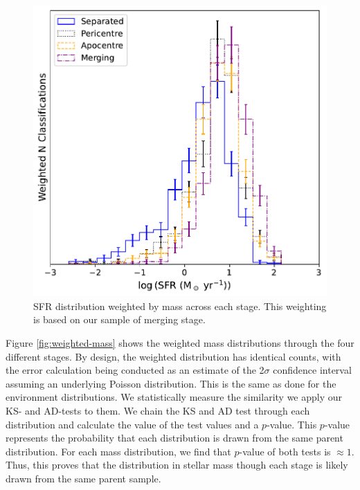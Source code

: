 \begin{figure}
\centering
\includegraphics[width=\textwidth]{Chapter3/figures/sfr_dist.pdf}
\caption[SFR distribution weighted by mass across each stage.]{SFR distribution weighted by mass across each stage. This weighting is based on our sample of merging stage.}
\label{fig:weighted-sfr}
\end{figure}

Figure \ref{fig:weighted-mass} shows the weighted mass distributions through the four different stages. By design, the weighted distribution has identical counts, with the error calculation being conducted as an estimate of the 2$\sigma$ confidence interval assuming an underlying Poisson distribution. This is the same as done for the environment distributions. We statistically measure the similarity we apply our KS- and AD-tests to them. We chain the KS and AD test through each distribution and calculate the value of the test values and a $p$-value. This $p$-value represents the probability that each distribution is drawn from the same parent distribution. For each mass distribution, we find that $p$-value of both tests is $\approx1$. Thus, this proves that the distribution in stellar mass though each stage is likely drawn from the same parent sample. 

